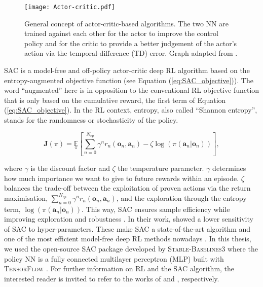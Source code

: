 \begin{figure}[!htbp]
\centering
\texttt{[image: Actor-critic.pdf]}
\caption{General concept of actor-critic-based algorithms. The two \gls{NN} are trained against each other for the actor to improve the control policy and for the critic to provide a better judgement of the actor's action via the temporal-difference (TD) error. Graph adapted from \cite{cao2020reinforcement}.}
\label{fig:Actor-critic}
\end{figure}

\newpage
\gls{SAC} is a model-free and off-policy actor-critic deep \gls{RL} algorithm based on the entropy-augmented objective function (see Equation (\ref{eq:SAC_objective})). The word ``augmented'' here is in opposition to the conventional \gls{RL} objective function that is only based on the cumulative reward, \ie the first term of Equation (\ref{eq:SAC_objective}). In the \gls{RL} context, entropy, also called ``Shannon entropy'', stands for the randomness or stochasticity of the policy.

\begin{equation}
    \label{eq:SAC_objective}
    \bm{J}(\pi) = \underset{\pi}{\mathbb{E}}\left[\underset{n=0}{\overset{N_{ep}}{\sum}}\gamma^n r_n\left(\bm{o}_n,\bm{a}_n \right) - \zeta \log \left(\pi\left(\bm{a}_n | \bm{o}_n\right) \right) \right],
\end{equation}

\noindent
where $\gamma$ is the discount factor and $\zeta$ the temperature parameter. $\gamma$ determines how much importance we want to give to future rewards within an episode. $\zeta$ balances the trade-off between the exploitation of proven actions via the return maximisation, \ie $\sum_{n=0}^{N_{ep}}\gamma^n r_n\left(\bm{o}_n,\bm{a}_n \right)$, and the exploration through the entropy term, \ie $\log \left(\pi\left(\bm{a}_n | \bm{o}_n\right) \right)$. This way, \gls{SAC} ensures sample efficiency while improving exploration \cite{haarnoja2017reinforcement} and robustness \cite{ziebart2010modeling}. In their work, \citet{haarnoja2017reinforcement} showed a lower sensitivity of \gls{SAC} to hyper-parameters. These make \gls{SAC} a state-of-the-art algorithm and one of the most efficient model-free deep RL methods nowadays \cite{haarnoja2017reinforcement}. In this thesis, we used the open-source \gls{SAC} package developed by \textsc{Stable-Baselines3} \cite{raffin2021stable} where the policy \gls{NN} is a fully connected multilayer perceptron (MLP) built with \textsc{TensorFlow} \cite{abadi2016tensorflow}. For further information on \gls{RL} and the \gls{SAC} algorithm, the interested reader is invited to refer to the works of \citet{sutton2018reinforcement} and \citet{haarnoja2018soft}, respectively.

